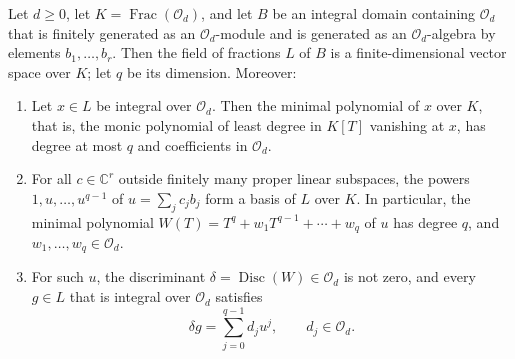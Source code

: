 \begin{lemma}\label{lem:finite-integral-algebra}
Let $d\geq0$, let $K=\operatorname{Frac}(\mathcal O_d)$, and let $B$ be an integral domain containing $\mathcal O_d$ that is finitely generated as an $\mathcal O_d$-module and is generated as an $\mathcal O_d$-algebra by elements $b_1,\ldots,b_r$. Then the field of fractions $L$ of $B$ is a finite-dimensional vector space over $K$; let $q$ be its dimension. Moreover:
\begin{enumerate}
\item Let $x\in L$ be integral over $\mathcal O_d$. Then the minimal polynomial of $x$ over $K$, that is, the monic polynomial of least degree in $K[T]$ vanishing at $x$, has degree at most $q$ and coefficients in $\mathcal O_d$.
\item For all $c\in\mathbb C^r$ outside finitely many proper linear subspaces, the powers $1,u,\ldots,u^{q-1}$ of $u=\sum_jc_jb_j$ form a basis of $L$ over $K$. In particular, the minimal polynomial $W(T)=T^q+w_1T^{q-1}+\cdots+w_q$ of $u$ has degree $q$, and $w_1,\ldots,w_q\in\mathcal O_d$.
\item For such $u$, the discriminant $\delta=\operatorname{Disc}(W)\in\mathcal O_d$ is not zero, and every $g\in L$ that is integral over $\mathcal O_d$ satisfies
\[
 \delta g=\sum_{j=0}^{q-1}d_ju^j,\qquad d_j\in\mathcal O_d.
\]
\end{enumerate}
\end{lemma}
